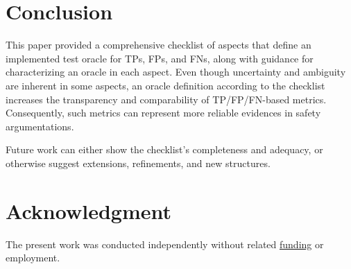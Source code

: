 \documentclass[conference]{IEEEtran}
\begin{document}

\section{Conclusion}
\label{sec:conclusion}

This paper provided a comprehensive checklist of aspects that define an implemented test oracle for TPs, FPs, and FNs, along with guidance for characterizing an oracle in each aspect.
Even though uncertainty and ambiguity are inherent in some aspects, an oracle definition according to the checklist increases the transparency and comparability of TP/FP/FN-based metrics.
Consequently, such metrics can represent more reliable evidences in safety argumentations.

Future work can either show the checklist's completeness and adequacy, or otherwise suggest extensions, refinements, and new structures. 



\section*{Acknowledgment}
\label{sec:acknowledgment}

The present work was conducted independently without related \href{https://ko-fi.com/michaelhoss}{funding} or employment. 

%
% 
% 
% 
% 
% 


{\small


}
\end{document}
